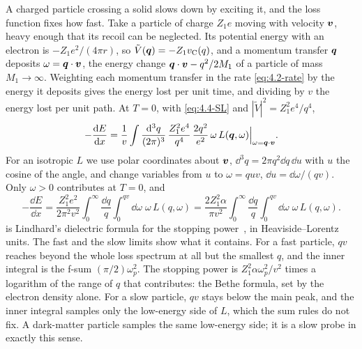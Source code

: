 A charged particle crossing a solid slows down by exciting it, and the loss function fixes how fast. Take a particle of charge $Z_1e$ moving with velocity $\bm{v}$, heavy enough that its recoil can be neglected. Its potential energy with an electron is $-Z_1e^2/(4\pi r)$, so $\tilde V(\bm{q}) = -Z_1v_{\mathrm{C}}(q)$, and a momentum transfer $\bm{q}$ deposits $\omega = \bm{q}\cdot\bm{v}$, the energy change $\bm{q}\cdot\bm{v} - q^2/2M_1$ of a particle of mass $M_1 \to \infty$. Weighting each momentum transfer in the rate \cref{eq:4.2-rate} by the energy it deposits gives the energy lost per unit time, and dividing by $v$ the energy lost per unit path. At $T = 0$, with \cref{eq:4.4-SL} and $|\tilde V|^2 = Z_1^2e^4/q^4$,
\begin{equation*}
  -\frac{\mathrm{d} E}{\mathrm{d} x} = \frac{1}{v}\int\frac{\mathrm{d}^3q}{(2\pi)^3}\,\frac{Z_1^2e^4}{q^4}\,\frac{2q^2}{e^2}\,\omega\,L(\bm{q},\omega)\Big|_{\omega = \bm{q}\cdot\bm{v}} .
\end{equation*}
For an isotropic $L$ we use polar coordinates about $\bm{v}$, $\dd^3q = 2\pi q^2\dd q\,\dd u$ with $u$ the cosine of the angle, and change variables from $u$ to $\omega = quv$, $\dd u = \dd\omega/(qv)$. Only $\omega > 0$ contributes at $T = 0$, and
\begin{equation}
  -\frac{\dd E}{\dd x} = \frac{Z_1^2e^2}{2\pi^2v^2}\int_0^\infty\frac{\dd q}{q}\int_0^{qv}\dd\omega\;\omega\,L(q,\omega) = \frac{2Z_1^2\alpha}{\pi v^2}\int_0^\infty\frac{\dd q}{q}\int_0^{qv}\dd\omega\;\omega\,L(q,\omega) .
  \label{eq:4.4-dEdx}
\end{equation}
 is Lindhard's dielectric formula for the stopping power~\cite{lindhard1954properties}, in Heaviside--Lorentz units. The fast and the slow limits show what it contains. For a fast particle, $qv$ reaches beyond the whole loss spectrum at all but the smallest $q$, and the inner integral is the f-sum $(\pi/2)\omega_p^2$. The stopping power is $Z_1^2\alpha\omega_p^2/v^2$ times a logarithm of the range of $q$ that contributes: the Bethe formula, set by the electron density alone. For a slow particle, $qv$ stays below the main peak, and the inner integral samples only the low-energy side of $L$, which the sum rules do not fix. A dark-matter particle samples the same low-energy side; it is a slow probe in exactly this sense.

